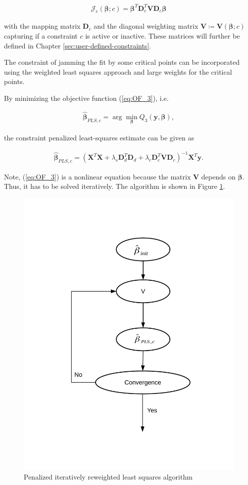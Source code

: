 \documentclass[10pt,a4paper]{article}
\begin{document}
	\begin{align} \label{eq:mapping_matrix}
		\mathcal{J}_c(\boldsymbol{\beta}; c) = \boldsymbol{\beta}^T \boldsymbol{D}_c^T \boldsymbol{V} \boldsymbol{D}_c  \boldsymbol{\beta}
	\end{align}

	with the mapping matrix $\boldsymbol{D}_c$ and the diagonal weighting matrix $\boldsymbol{V} \coloneqq \boldsymbol{V}(\boldsymbol{\beta}; c)$ capturing if a constraint $c$ is active or inactive. These matrices will further be defined in Chapter \ref{sec:user-defined-constraints}.
	
	The constraint of jamming the fit by some critical points can be incorporated using the weighted least squares approach and large weights for the critical points. \cite{strutz2016data}
	
	By minimizing the objective function (\ref{eq:OF_3}), i.e.
	
	\begin{align}\label{eq:optimization_problem_3}
		\boldsymbol{\hat \beta}_{PLS, c} = \arg \min_{\boldsymbol{\beta}} Q_3(\boldsymbol{y}, \boldsymbol{\beta}),
	\end{align}
	
	the constraint penalized least-squares estimate can be given as
	
	\begin{align} \label{eq:PLS,c_coef}
		\boldsymbol{\hat \beta}_{PLS, c} = (\boldsymbol{X}^T \boldsymbol{X} + \lambda_s \boldsymbol{D}_d^T \boldsymbol{D}_d + \lambda_c \boldsymbol{D}^T_c \boldsymbol{V} \boldsymbol{D}_c)^{-1} \boldsymbol{X}^T \boldsymbol{y}.
	\end{align}	
 
 	Note, (\ref{eq:OF_3}) is a nonlinear equation because the matrix $\boldsymbol{V}$ depends on $\boldsymbol{\beta}$. Thus, it has to be solved iteratively. The algorithm is shown in Figure \ref{fig:pirls}. 
 	
 	\begin{figure}[H]
 		\centering
 		\includegraphics[width=0.5\linewidth]{../thesisplots/algorithm.pdf}
 		\caption{Penalized iteratively reweighted least squares algorithm}
 		\label{fig:pirls}
 	\end{figure}
 	  
\end{document}
